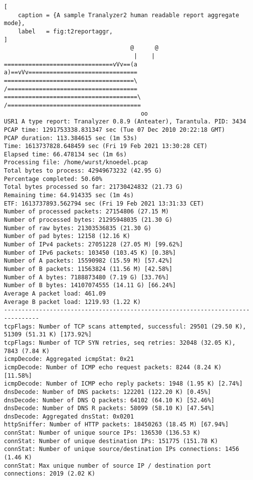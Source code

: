 \begin{lstlisting}[
    caption = {A sample Tranalyzer2 human readable report aggregate mode},
    label   = fig:t2reportaggr,
]
                                    @      @
                                     |    |
===============================vVv==(a    a)==vVv===============================
=====================================\    /=====================================
======================================\  /======================================
                                       oo
USR1 A type report: Tranalyzer 0.8.9 (Anteater), Tarantula. PID: 3434
PCAP time: 1291753338.831347 sec (Tue 07 Dec 2010 20:22:18 GMT)
PCAP duration: 113.384615 sec (1m 53s)
Time: 1613737828.648459 sec (Fri 19 Feb 2021 13:30:28 CET)
Elapsed time: 66.478134 sec (1m 6s)
Processing file: /home/wurst/knoedel.pcap
Total bytes to process: 42949673232 (42.95 G)
Percentage completed: 50.60%
Total bytes processed so far: 21730424832 (21.73 G)
Remaining time: 64.914335 sec (1m 4s)
ETF: 1613737893.562794 sec (Fri 19 Feb 2021 13:31:33 CET)
Number of processed packets: 27154806 (27.15 M)
Number of processed bytes: 21295948035 (21.30 G)
Number of raw bytes: 21303536835 (21.30 G)
Number of pad bytes: 12158 (12.16 K)
Number of IPv4 packets: 27051228 (27.05 M) [99.62%]
Number of IPv6 packets: 103450 (103.45 K) [0.38%]
Number of A packets: 15590982 (15.59 M) [57.42%]
Number of B packets: 11563824 (11.56 M) [42.58%]
Number of A bytes: 7188873480 (7.19 G) [33.76%]
Number of B bytes: 14107074555 (14.11 G) [66.24%]
Average A packet load: 461.09
Average B packet load: 1219.93 (1.22 K)
--------------------------------------------------------------------------------
tcpFlags: Number of TCP scans attempted, successful: 29501 (29.50 K), 51309 (51.31 K) [173.92%]
tcpFlags: Number of TCP SYN retries, seq retries: 32048 (32.05 K), 7843 (7.84 K)
icmpDecode: Aggregated icmpStat: 0x21
icmpDecode: Number of ICMP echo request packets: 8244 (8.24 K) [11.58%]
icmpDecode: Number of ICMP echo reply packets: 1948 (1.95 K) [2.74%]
dnsDecode: Number of DNS packets: 122201 (122.20 K) [0.45%]
dnsDecode: Number of DNS Q packets: 64102 (64.10 K) [52.46%]
dnsDecode: Number of DNS R packets: 58099 (58.10 K) [47.54%]
dnsDecode: Aggregated dnsStat: 0x0201
httpSniffer: Number of HTTP packets: 18450263 (18.45 M) [67.94%]
connStat: Number of unique source IPs: 136530 (136.53 K)
connStat: Number of unique destination IPs: 151775 (151.78 K)
connStat: Number of unique source/destination IPs connections: 1456 (1.46 K)
connStat: Max unique number of source IP / destination port connections: 2019 (2.02 K)

\end{lstlisting}
